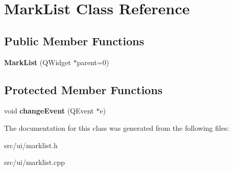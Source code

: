 \hypertarget{classMarkList}{
\section{MarkList Class Reference}
\label{classMarkList}
}
\subsection*{Public Member Functions}
\begin{DoxyCompactItemize}
\item 
\hypertarget{classMarkList_a46c5e61272ee30203b85e377fd4776a2}{
{\bfseries MarkList} (QWidget $\ast$parent=0)}
\label{classMarkList_a46c5e61272ee30203b85e377fd4776a2}

\end{DoxyCompactItemize}
\subsection*{Protected Member Functions}
\begin{DoxyCompactItemize}
\item 
\hypertarget{classMarkList_ad774247152f1a9571b34f08d788e36be}{
void {\bfseries changeEvent} (QEvent $\ast$e)}
\label{classMarkList_ad774247152f1a9571b34f08d788e36be}

\end{DoxyCompactItemize}


The documentation for this class was generated from the following files:\begin{DoxyCompactItemize}
\item 
src/ui/marklist.h\item 
src/ui/marklist.cpp\end{DoxyCompactItemize}
